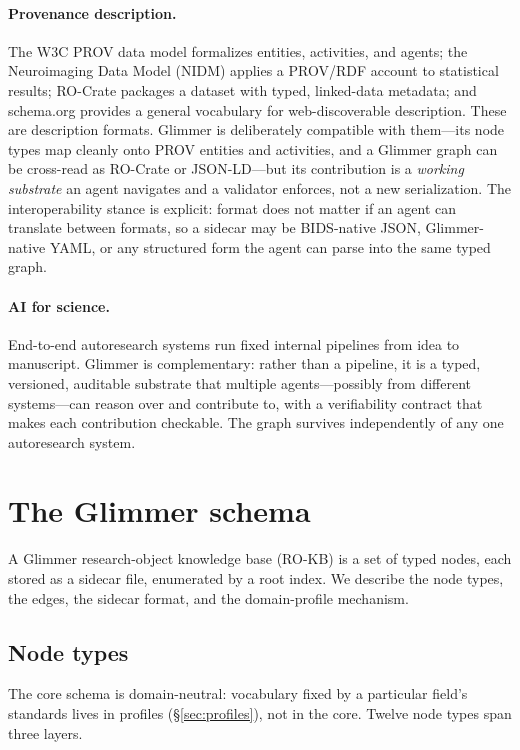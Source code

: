 \documentclass[preprint]{glimmer-paper}
\begin{document}
\paragraph{Provenance description.} The W3C PROV data model \citep{w3cprov2013}
formalizes entities, activities, and agents; the Neuroimaging Data Model (NIDM)
\citep{maumet2016nidm} applies a PROV/RDF account to statistical results; RO-Crate
\citep{soilandreyes2022rocrate} packages a dataset with typed, linked-data metadata; and
schema.org provides a general vocabulary for web-discoverable description. These are
description formats. Glimmer is deliberately compatible with them---its node types map
cleanly onto PROV entities and activities, and a Glimmer graph can be cross-read as
RO-Crate or JSON-LD---but its contribution is a \emph{working substrate} an agent
navigates and a validator enforces, not a new serialization. The interoperability stance
is explicit: format does not matter if an agent can translate between formats, so a
sidecar may be BIDS-native JSON, Glimmer-native YAML, or any structured form the agent can
parse into the same typed graph.

\paragraph{AI for science.} End-to-end autoresearch systems
\citep{lu2024aiscientist,boiko2023coscientist} run fixed internal pipelines from idea to
manuscript. Glimmer is complementary: rather than a pipeline, it is a typed, versioned,
auditable substrate that multiple agents---possibly from different systems---can reason
over and contribute to, with a verifiability contract that makes each contribution
checkable. The graph survives independently of any one autoresearch system.

\section{The Glimmer schema}
\label{sec:schema}

A Glimmer research-object knowledge base (RO-KB) is a set of typed nodes, each stored as a
sidecar file, enumerated by a root index. We describe the node types, the edges, the
sidecar format, and the domain-profile mechanism.

\subsection{Node types}

The core schema is domain-neutral: vocabulary fixed by a particular field's standards
lives in profiles (\S\ref{sec:profiles}), not in the core. Twelve node types span three
layers.
\end{document}
